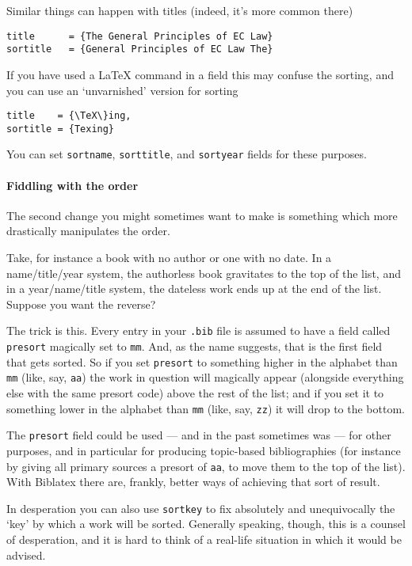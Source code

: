 Similar things can happen with titles (indeed, it's more common
there)\label{sorting:sorttitle}
\begin{Verbatim}
title      = {The General Principles of EC Law}
sortitle   = {General Principles of EC Law The}
\end{Verbatim}

If you have used a LaTeX command in a field this may confuse the
sorting, and you can use an `unvarnished' version for sorting
\begin{Verbatim}
title    = {\TeX\}ing,
sortitle = {Texing}
\end{Verbatim}

You can set \texttt{sortname}, \texttt{sorttitle}, and \texttt{sortyear}
fields for these purposes.

\paragraph{Fiddling with the order} The second change you might sometimes
want to make is something which more drastically manipulates the order.

Take, for instance a book with no author or one with no date. In a
name/title/year system, the authorless book gravitates to the top of
the list, and in a year/name/title system, the dateless work ends up
at the end of the list. Suppose you want the reverse?

The trick is this. Every entry in your \texttt{.bib} file is assumed
to have a field called \texttt{presort} magically set to
\texttt{mm}. And, as the name suggests, that is the first field that
gets sorted. So if you set \texttt{presort} to something higher in the
alphabet than \texttt{mm} (like, say, \texttt{aa}) the work in
question will magically appear (alongside everything else with the
same presort code) above the rest of the list; and if you set it to
something lower in the alphabet than \texttt{mm} (like, say,
\texttt{zz}) it will drop to the bottom.

The \texttt{presort} field could be used --- and in the past sometimes
was --- for other purposes, and in particular for producing
topic-based bibliographies (for instance by giving all primary sources
a presort of \texttt{aa}, to move them to the top of the list). With
Biblatex there are, frankly, better ways of achieving that sort of
result.

In desperation you can also use \texttt{sortkey} to fix absolutely and
unequivocally the `key' by which a work will be sorted. Generally
speaking, though, this is a counsel of desperation, and it is hard to
think of a real-life situation in which it would be advised.
